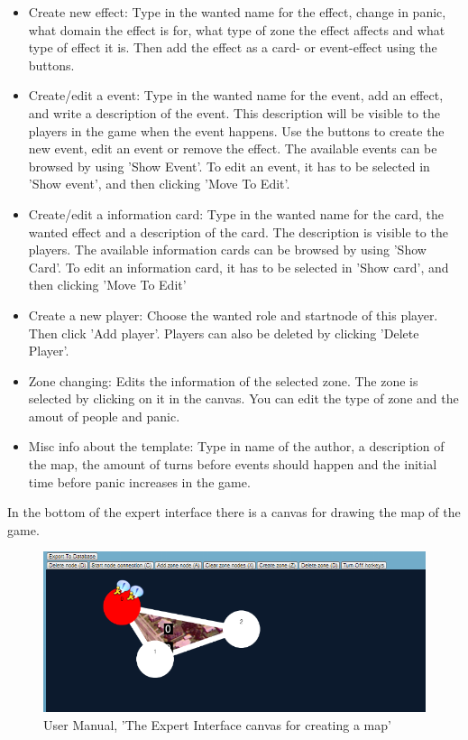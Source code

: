 \begin{itemize}
\item Create new effect: Type in the wanted name for the effect, change in panic, what domain the effect is for, what type of zone the effect affects and what type of effect it is. Then add the effect as a card- or event-effect using the buttons.
\item Create/edit a event: Type in the wanted name for the event, add an effect, and write a description of the event. This description will be visible to the players in the game when the event happens. Use the buttons to create the new event, edit an event or remove the effect. The available events can be browsed by using 'Show Event'. To edit an event, it has to be selected in 'Show event', and then clicking 'Move To Edit'.
\item Create/edit a information card: Type in the wanted name for the card, the wanted effect and a description of the card. The description is visible to the players. The available information cards can be browsed by using 'Show Card'. To edit an information card, it has to be selected in 'Show card', and then clicking 'Move To Edit'
\item Create a new player: Choose the wanted role and startnode of this player. Then click 'Add player'. Players can also be deleted by clicking 'Delete Player'.
\item Zone changing: Edits the information of the selected zone. The zone is selected by clicking on it in the canvas. You can edit the type of zone and the amout of people and panic.
\item Misc info about the template: Type in name of the author, a description of the map, the amount of turns before events should happen and the initial time before panic increases in the game.
\end{itemize}

\noindent In the bottom of the expert interface there is a canvas for drawing the map of the game.

\begin{figure}[H]
  \centering
    \includegraphics[width=1.0\textwidth]{img/expertinterfacecanvasmanual.png}
  \caption{User Manual, 'The Expert Interface canvas for creating a map'}
  \label{fig:expertinterfacecanvas}
\end{figure}

